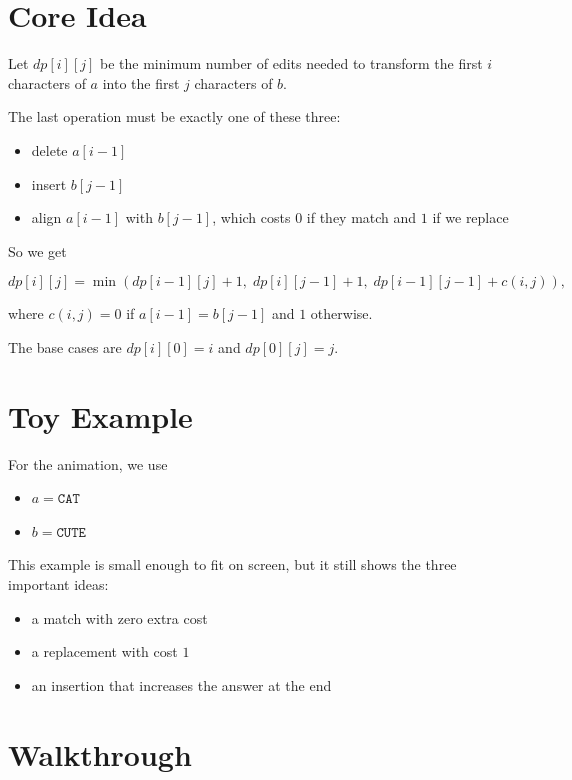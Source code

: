\section{Core Idea}

Let $dp[i][j]$ be the minimum number of edits needed to transform the first
$i$ characters of $a$ into the first $j$ characters of $b$.

The last operation must be exactly one of these three:

\begin{itemize}
\item delete $a[i-1]$
\item insert $b[j-1]$
\item align $a[i-1]$ with $b[j-1]$, which costs $0$ if they match and $1$ if we replace
\end{itemize}

So we get

$$
dp[i][j] =
\min\left(
dp[i-1][j] + 1,\;
dp[i][j-1] + 1,\;
dp[i-1][j-1] + c(i,j)
\right),
$$

where $c(i,j)=0$ if $a[i-1]=b[j-1]$ and $1$ otherwise.

The base cases are $dp[i][0] = i$ and $dp[0][j] = j$.

\section{Toy Example}

For the animation, we use

\begin{itemize}
\item $a = \texttt{CAT}$
\item $b = \texttt{CUTE}$
\end{itemize}

This example is small enough to fit on screen, but it still shows the three
important ideas:

\begin{itemize}
\item a match with zero extra cost
\item a replacement with cost $1$
\item an insertion that increases the answer at the end
\end{itemize}

\section{Walkthrough}

